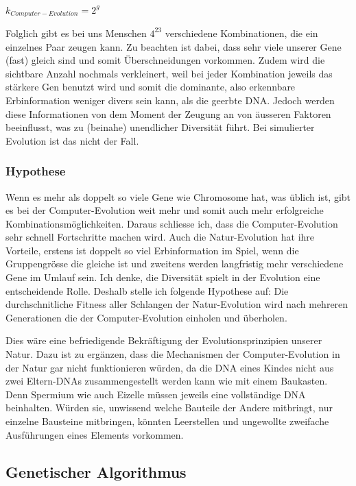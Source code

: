 \documentclass[10pt,a4paper,ngerman,english]{article}
\begin{document}
\(k_{Computer-Evolution}=2^g\)
\bigskip

Folglich gibt es bei uns Menschen \(4^{23}\) verschiedene Kombinationen, die ein einzelnes Paar zeugen kann. Zu beachten ist dabei, dass sehr viele unserer Gene (fast) gleich sind und somit Überschneidungen vorkommen. Zudem wird die sichtbare Anzahl nochmals verkleinert, weil bei jeder Kombination jeweils das stärkere Gen benutzt wird und somit die dominante, also erkennbare Erbinformation weniger divers sein kann, als die geerbte DNA. Jedoch werden diese Informationen von dem Moment der Zeugung an von äusseren Faktoren beeinflusst, was zu (beinahe) unendlicher Diversität führt. Bei simulierter Evolution ist das nicht der Fall.

\subsubsection{Hypothese}

Wenn es mehr als doppelt so viele Gene wie Chromosome hat, was üblich ist, gibt es bei der Computer-Evolution weit mehr und somit auch mehr erfolgreiche Kombinationsmöglichkeiten. Daraus schliesse ich, dass die Computer-Evolution sehr schnell Fortschritte machen wird. Auch die Natur-Evolution hat ihre Vorteile, erstens ist doppelt so viel Erbinformation im Spiel, wenn die Gruppengrösse die gleiche ist und zweitens werden langfristig mehr verschiedene Gene im Umlauf sein. Ich denke, die Diversität spielt in der Evolution eine entscheidende Rolle. Deshalb stelle ich folgende Hypothese auf: Die durchschnitliche Fitness aller Schlangen der Natur-Evolution wird nach mehreren Generationen die der Computer-Evolution einholen und überholen. 

Dies wäre eine befriedigende Bekräftigung der Evolutionsprinzipien unserer Natur. Dazu ist zu ergänzen, dass die Mechanismen der Computer-Evolution in der Natur gar nicht funktionieren würden, da die DNA eines Kindes nicht aus zwei Eltern-DNAs zusammengestellt werden kann wie mit einem Baukasten. Denn Spermium wie auch Eizelle müssen jeweils eine vollständige DNA beinhalten. Würden sie, unwissend welche Bauteile der Andere mitbringt, nur einzelne Bausteine mitbringen, könnten Leerstellen und ungewollte zweifache Ausführungen eines Elements vorkommen.

\subsection{Genetischer Algorithmus}
\end{document}
